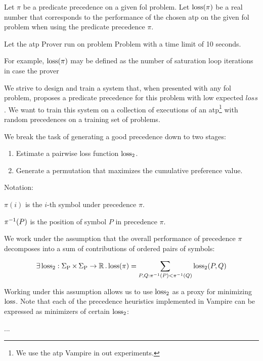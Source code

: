 Let \(\pi\) be a predicate precedence on a given \gls{fol} problem.
Let \(\operatorname{loss}(\pi)\) be a real number that corresponds to the performance of the chosen \gls{atp}
on the given \gls{fol} problem when using the predicate precedence \(\pi\).

Let the \gls{atp} Prover run on problem Problem with a time limit of 10 seconds.


For example, \(\operatorname{loss}(\pi)\) may be defined as the number of saturation loop iterations in case the prover

We strive to design and train a system that, when presented with any \gls{fol} problem,
proposes a predicate precedence for this problem with low expected \(loss\).
We want to train this system on a collection of executions of an \gls{atp}\footnote{We use the \gls{atp} Vampire in out experiments.} with random precedences on a training set of problems.

We break the task of generating a good precedence down to two stages:

\begin{enumerate}
	\item Estimate a pairwise loss function \(\operatorname{loss}_2\).
	\item Generate a permutation that maximizes the cumulative preference value.
\end{enumerate}

Notation:

\(\pi(i)\) is the \(i\)-th symbol under precedence \(\pi\).

\(\pi^{-1}(P)\) is the position of symbol \(P\) in precedence \(\pi\).

We work under the assumption that the overall performance of precedence \(\pi\) decomposes into a sum of contributions of ordered pairs of symbols:

\begin{align*}
\exists \operatorname{loss}_2 : \operatorname{\Sigma_P} \times \operatorname{\Sigma_P} \rightarrow \operatorname{\mathbb{R}} . \operatorname{loss}(\pi) = \sum_{P, Q: \pi^{-1}(P) < \pi^{-1}(Q)} \operatorname{loss}_2(P, Q)
\end{align*}

Working under this assumption allows us to use \(\operatorname{loss}_2\) as a proxy for minimizing \(\operatorname{loss}\).
Note that each of the precedence heuristics implemented in Vampire can be expressed as minimizers of certain \(\operatorname{loss}_2\):

...



